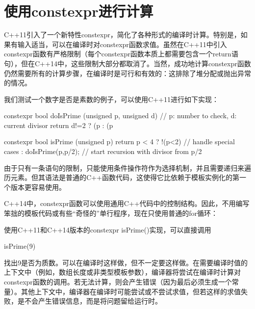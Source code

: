\section{使用constexpr进行计算}
C++11引入了一个新特性constexpr，简化了各种形式的编译时计算。特别是，如果有输入适当，可以在编译时对constexpr函数求值。虽然在C++11中引入constexpr函数有严格限制（每个constexpr函数本质上都需要包含一个return语句），但在C++14中，这些限制大部分都取消了。当然，成功地计算constexpr函数仍然需要所有的计算步骤，在编译时是可行和有效的：这排除了堆分配或抛出异常的情况。

我们测试一个数字是否是素数的例子，可以使用C++11进行如下实现：

\begin{cpp}
constexpr bool
doIsPrime (unsigned p, unsigned d) { // p: number to check, d: current divisor
	return d!=2 ? (p%
	: (p%
}

constexpr bool isPrime (unsigned p) {
	return p < 4 ? !(p<2) // handle special cases
	: doIsPrime(p,p/2); // start recursion with divisor from p/2
}
\end{cpp}

由于只有一条语句的限制，只能使用条件操作符作为选择机制，并且需要递归来遍历元素。但其语法是普通的C++函数代码，这使得它比依赖于模板实例化的第一个版本更容易使用。

C++14中，constexpr函数可以使用通用C++代码中的控制结构。因此，不用编写笨拙的模板代码或有些“奇怪的”单行程序，现在只使用普通的for循环：


使用C++11和C++14版本的constexpr isPrime()实现，可以直接调用

\begin{cpp}
isPrime(9)
\end{cpp}

找出9是否为质数。可以在编译时这样做，但不一定要这样做。在需要编译时值的上下文中（例如，数组长度或非类型模板参数），编译器将尝试在编译时计算对constexpr函数的调用。若无法计算，则会产生错误（因为最后必须生成一个常量）。其他上下文中，编译器在编译时可能尝试或不尝试求值，但若这样的求值失败，是不会产生错误信息，而是将问题留给运行时。

